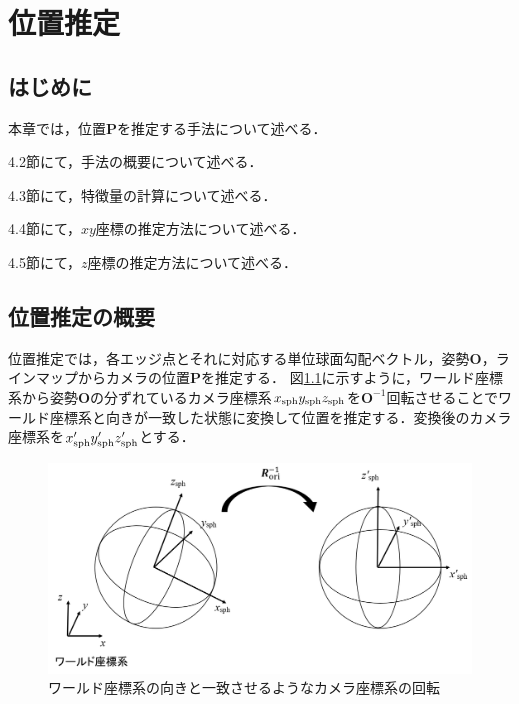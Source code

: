 \chapter{位置推定}
\thispagestyle{empty}
\label{chap4}
\minitoc

\newpage
\section{はじめに}

本章では，位置$\bm{P}$を推定する手法について述べる．

4.2節にて，手法の概要について述べる．

4.3節にて，特徴量の計算について述べる．

4.4節にて，$xy$座標の推定方法について述べる．

4.5節にて，$z$座標の推定方法について述べる．


\clearpage
\section{位置推定の概要}

位置推定では，各エッジ点とそれに対応する単位球面勾配ベクトル，姿勢$\bm{O}$，ラインマップからカメラの位置$\bm{P}$を推定する．
図\ref{fig:derotation}に示すように，ワールド座標系から姿勢$\bm{O}$の分ずれているカメラ座標系$x_{\rm{sph}}y_{\rm{sph}}z_{\rm{sph}}$を$\bm{O}^{-1}$回転させることでワールド座標系と向きが一致した状態に変換して位置を推定する．変換後のカメラ座標系を$x'_{\rm{sph}}y'_{\rm{sph}}z'_{\rm{sph}}$とする．
\\

\begin{figure}[b]
 \begin{center}
 \includegraphics[width=0.85\columnwidth]{./chap4/fig/derotation.png}
 \caption{ワールド座標系の向きと一致させるようなカメラ座標系の回転}
 \label{fig:derotation}
 \end{center}
\end{figure}

